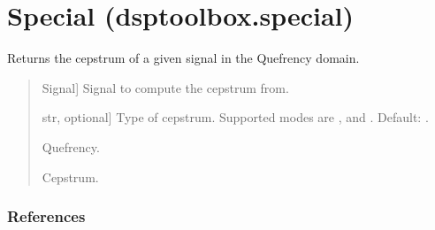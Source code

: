 \documentclass[letterpaper,10pt,english]{sphinxmanual}
\begin{document}
\sphinxstepscope


\section{Special (dsptoolbox.special)}
\label{\detokenize{modules/dsptoolbox.special:module-dsptoolbox.special}}\label{\detokenize{modules/dsptoolbox.special:special-dsptoolbox-special}}\label{\detokenize{modules/dsptoolbox.special::doc}}

\begin{fulllineitems}
\label{\detokenize{modules/dsptoolbox.special:dsptoolbox.special.cepstrum}}
\pysigstartsignatures
{}
\pysigstopsignatures
\sphinxAtStartPar
Returns the cepstrum of a given signal in the Quefrency domain.
\begin{quote}\begin{description}
\begin{description}
\sphinxlineitem{\sphinxstylestrong{signal}}{[}Signal{]}
\sphinxAtStartPar
Signal to compute the cepstrum from.

\sphinxlineitem{\sphinxstylestrong{mode}}{[}str, optional{]}
\sphinxAtStartPar
Type of cepstrum. Supported modes are ,  and
. Default: .

\end{description}

\begin{description}
\sphinxlineitem{\sphinxstylestrong{que}}{[}\sphinxtitleref{np.ndarray}{]}
\sphinxAtStartPar
Quefrency.

\sphinxlineitem{\sphinxstylestrong{ceps}}{[}\sphinxtitleref{np.ndarray}{]}
\sphinxAtStartPar
Cepstrum.

\end{description}

\end{description}\end{quote}
\subsubsection*{References}

\sphinxAtStartPar
{}

\end{fulllineitems}
\end{document}
